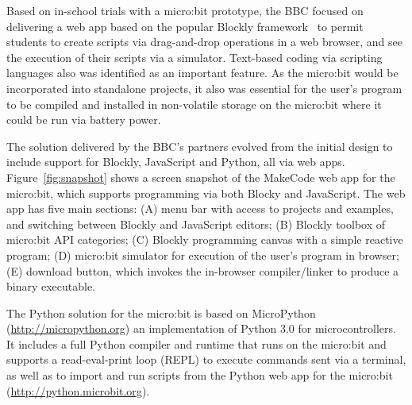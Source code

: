 Based on in-school trials with a micro:bit prototype, the BBC focused on delivering a web app
based on the popular Blockly framework~\cite{Blocky2015} to permit students to
create scripts via drag-and-drop operations in a web browser, and see
the execution of their scripts via a simulator.
Text-based coding via scripting languages also
was identified as an important feature. As the micro:bit would be incorporated
into standalone projects, it also was essential for the user's program to be
compiled and installed in non-volatile storage on the micro:bit where it
could be run via battery power.



The solution delivered by the BBC's partners evolved from the initial
design to include support for Blockly, JavaScript and Python, all
via web apps.
Figure~\ref{fig:snapshot} shows a screen snapshot of the MakeCode web app
for the micro:bit,
which supports programming via both Blocky and JavaScript.
The web app has five main sections: (A) menu bar with access to projects
and examples, and switching between Blockly and JavaScript editors; (B)
Blockly toolbox of micro:bit API categories; (C) Blockly programming
canvas with a simple reactive program; (D) micro:bit simulator for execution
of the user's program in browser; (E) download button, which invokes the in-browser
compiler/linker to produce a binary executable.


The Python solution for the micro:bit is based on MicroPython (\url{http://micropython.org})
an implementation of Python 3.0 for microcontrollers. It includes
a full Python compiler and runtime that runs on the micro:bit and
supports a read-eval-print loop (REPL) to execute commands sent via
a terminal, as well as to import and run scripts from the Python web app for
the micro:bit (\url{http://python.microbit.org}).

